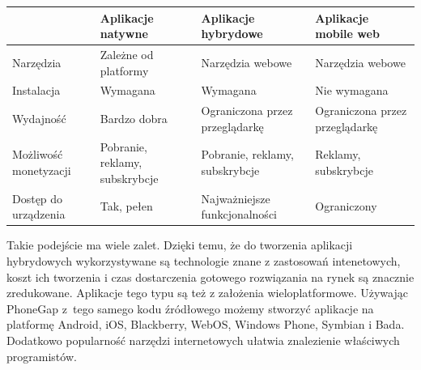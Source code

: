 \documentclass[brudnopis]{xmgr}
\begin{document}
\begin{center}
    \begin{tabularx}{\textwidth}{ | X | X | X | X |}
    \hline
   			& Aplikacje natywne        & Aplikacje hybrydowe 	& Aplikacje mobile web 			\\ \hline
    Narzędzia	& Zależne od platformy	&   Narzędzia webowe	& 	Narzędzia webowe			\\ \hline
    Instalacja	&        Wymagana               &	 Wymagana         	& 		Nie wymagana		\\ \hline
    Wydajność	& 	Bardzo dobra		&Ograniczona przez przeglądarkę&Ograniczona przez przeglądarkę\\ \hline
    Możliwość monetyzacji
    			&  Pobranie, reklamy, subskrybcje  & Pobranie, reklamy, subskrybcje & Reklamy, subskrybcje \\ \hline
    Dostęp do urządzenia
    			& 	Tak, pełen  	         &Najważniejsze funkcjonalności& Ograniczony        \\ \hline
    \end{tabularx}
\end{center}

Takie podejście ma wiele zalet. Dzięki temu, że do tworzenia aplikacji hybrydowych wykorzystywane są technologie
znane z zastosowań intenetowych, koszt ich tworzenia i czas dostarczenia
gotowego rozwiązania na rynek są znacznie zredukowane. Aplikacje tego typu są też
z założenia wieloplatformowe. Używając PhoneGap z~tego samego kodu źródłowego
możemy stworzyć aplikacje na platformę Android, iOS, Blackberry, WebOS,
Windows Phone, Symbian i Bada. Dodatkowo popularność narzędzi internetowych
ułatwia znalezienie właściwych programistów.
\end{document}
